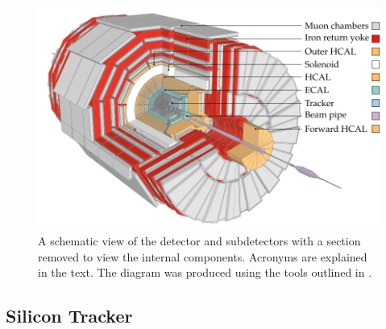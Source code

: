 \begin{figure}[htbp]
    \centering
    \includegraphics[]{diagrams/tikz/cms/annotated/cms_full.pdf}
    \caption{
        A schematic view of the \CMS detector and subdetectors with a section
        removed to view the internal components. Acronyms are explained in the
        text. The diagram was produced using the tools outlined in
        \cite{Sakuma:2013jqa}.
    }
    \label{fig:cms-full}
\end{figure}

\subsection{Silicon Tracker}

